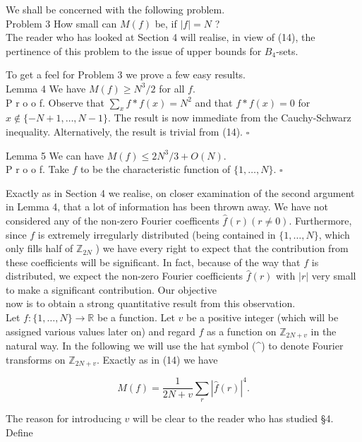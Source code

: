 \documentclass[10pt]{article}
\begin{document}
We shall be concerned with the following problem.\\
Problem 3 How small can $M(f)$ be, if $|f|=N$ ?\\
The reader who has looked at Section 4 will realise, in view of (14), the pertinence of this problem to the issue of upper bounds for $B_{4}$-sets.

To get a feel for Problem 3 we prove a few easy results.\\
Lemma 4 We have $M(f) \geq N^{3} / 2$ for all $f$.\\
P r o o f. Observe that $\sum_{x} f * f(x)=N^{2}$ and that $f * f(x)=0$ for $x \notin\{-N+1, \ldots, N-1\}$. The result is now immediate from the Cauchy-Schwarz inequality. Alternatively, the result is trivial from (14). \(\square\)

Lemma 5 We can have $M(f) \leq 2 N^{3} / 3+O(N)$.\\
P r o o f. Take $f$ to be the characteristic function of $\{1, \ldots, N\}$. \(\square\)

Exactly as in Section 4 we realise, on closer examination of the second argument in Lemma 4, that a lot of information has been thrown away. We have not considered any of the non-zero Fourier coefficents $\hat{f}(r)(r \neq 0)$. Furthermore, since $f$ is extremely irregularly distributed (being contained in $\{1, \ldots, N\}$, which only fills half of $\mathbb{Z}_{2 N}$ ) we have every right to expect that the contribution from these coefficients will be significant. In fact, because of the way that $f$ is distributed, we expect the non-zero Fourier coefficients $\hat{f}(r)$ with $|r|$ very small to make a significant contribution. Our objective\\
now is to obtain a strong quantitative result from this observation.\\
Let $f:\{1, \ldots, N\} \rightarrow \mathbb{R}$ be a function. Let $v$ be a positive integer (which will be assigned various values later on) and regard $f$ as a function on $\mathbb{Z}_{2 N+v}$ in the natural way. In the following we will use the hat symbol (\^{}) to denote Fourier transforms on $\mathbb{Z}_{2 N+v}$. Exactly as in (14) we have


\begin{equation*}
M(f)=\frac{1}{2 N+v} \sum_{r}|\hat{f}(r)|^{4} . \tag{15}
\end{equation*}


The reason for introducing $v$ will be clear to the reader who has studied §4.\\
Define
\end{document}
